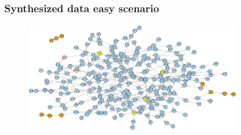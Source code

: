 \documentclass{beamer}
\begin{document}
\begin{frame}[plain]
  \frametitle{Synthesized data easy scenario}
  \begin{figure}
    \includegraphics[width=0.8\textwidth]{synthesized-easy}
  \end{figure}
\end{frame}
\end{document}
